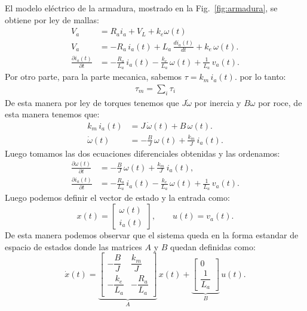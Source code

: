 \documentclass[
  11pt,
  letterpaper,
   addpoints,
   answers
  ]{exam}
\begin{document}
\begin{solution}
El modelo eléctrico de la armadura, mostrado en la Fig.~\ref{fig:armadura}, se obtiene por ley de mallas:
\begin{align}
V_{a}&= R_{a}i_{a} + V_L + k_e \omega(t)\\ 
V_a&=-R_a\,i_a(t)+L_a\,\frac{di_a(t)}{dt}+k_e\,\omega(t).\\
\frac{\partial i_a(t)}{\partial t} &= -\frac{R_a}{L_a}\,i_a(t)-\frac{k_e}{L_a}\,\omega(t)+\frac{1}{L_a}\,v_a(t).
\end{align}
Por otro parte, para la parte mecanica, sabemos $\tau = k_m\,i_a(t)$. por lo tanto:
\begin{align}
\tau_m = \sum_{i} \tau_i 
\end{align}
De esta manera por ley de torques tenemos que $J \dot{\omega}$ por inercia y $B \omega$ por roce, de esta manera tenemos que:
\begin{align}
  k_m\,i_a(t)&=J\,\dot{\omega}(t)+B\,\omega(t).\\
  \dot{\omega}(t)&=-\frac{B}{J}\,\omega(t)+\frac{k_m}{J}\,i_a(t).
\end{align}
Luego tomamos las dos ecuaciones diferenciales obtenidas y las ordenamos:
\begin{align}
 \frac{\partial \omega(t)}{\partial t} &= -\frac{B}{J}\,\omega(t)+\frac{k_m}{J}\,i_a(t),\\
  \frac{\partial i_a(t)}{\partial t} &= -\frac{R_a}{L_a}\,i_a(t)-\frac{k_e}{L_a}\,\omega(t)+\frac{1}{L_a}\,v_a(t).
\end{align}
Luego podemos definir el vector de estado y la entrada como:
\begin{equation}
  x(t)=\begin{bmatrix}\omega(t)\\ i_a(t)\end{bmatrix},
  \qquad
  u(t)=v_a(t).
\end{equation}
De esta manera podemos observar que el sistema queda en la forma estandar de espacio de estados donde las matrices $A$ y $B$ quedan definidas como:
\begin{equation}
  \dot{x}(t)=
  \underbrace{\begin{bmatrix}
    -\dfrac{B}{J} & \dfrac{k_m}{J}\\[6pt]
    -\dfrac{k_e}{L_a} & -\dfrac{R_a}{L_a}
  \end{bmatrix}}_{A}\,x(t)
  +
  \underbrace{\begin{bmatrix}
    0\\[2pt]\dfrac{1}{L_a}
  \end{bmatrix}}_{B}\,u(t).

\end{equation}
\end{solution}
\end{document}
